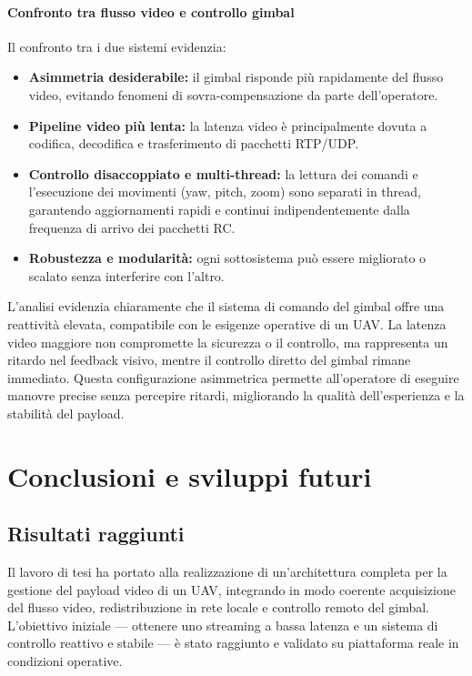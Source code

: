 \subsubsection{Confronto tra flusso video e controllo gimbal}

Il confronto tra i due sistemi evidenzia:

\begin{itemize}
    \item \textbf{Asimmetria desiderabile:} il gimbal risponde più rapidamente del flusso video, evitando fenomeni di sovra-compensazione da parte dell’operatore.  
    \item \textbf{Pipeline video più lenta:} la latenza video è principalmente dovuta a codifica, decodifica e trasferimento di pacchetti RTP/UDP.  
    \item \textbf{Controllo disaccoppiato e multi-thread:} la lettura dei comandi e l’esecuzione dei movimenti (yaw, pitch, zoom) sono separati in thread, garantendo aggiornamenti rapidi e continui indipendentemente dalla frequenza di arrivo dei pacchetti RC.  
    \item \textbf{Robustezza e modularità:} ogni sottosistema può essere migliorato o scalato senza interferire con l’altro.
\end{itemize}


L’analisi evidenzia chiaramente che il sistema di comando del gimbal offre una reattività elevata, compatibile con le esigenze operative di un UAV.  
La latenza video maggiore non compromette la sicurezza o il controllo, ma rappresenta un ritardo nel feedback visivo, mentre il controllo diretto del gimbal rimane immediato.  
Questa configurazione asimmetrica permette all’operatore di eseguire manovre precise senza percepire ritardi, migliorando la qualità dell’esperienza e la stabilità del payload.



\chapter{Conclusioni e sviluppi futuri}
\label{cap:conclusioni}
\newpage

\section{Risultati raggiunti}


Il lavoro di tesi ha portato alla realizzazione di un’architettura completa
per la gestione del payload video di un UAV, integrando in modo coerente
acquisizione del flusso video, redistribuzione in rete locale e controllo remoto
del gimbal. L’obiettivo iniziale — ottenere uno streaming a bassa latenza
e un sistema di controllo reattivo e stabile — è stato raggiunto e validato
su piattaforma reale in condizioni operative.

